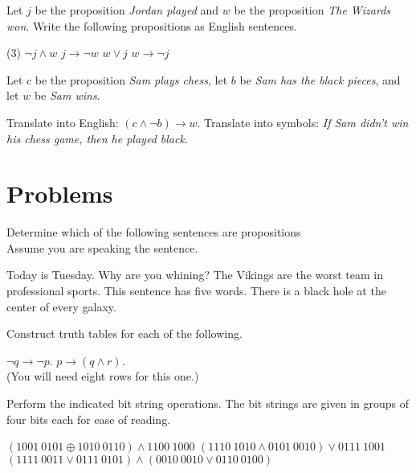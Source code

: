 \clearpage
\begin{exer}
Let $j$ be the proposition {\itshape Jordan played} and $w$ be the proposition 
{\itshape The Wizards won}.
Write the following propositions as English sentences. 

\begin{tasks}(3)
	\task $\lnot j\wedge w$  
	\task $j\to \lnot w$ 
	\task $w\lor j$
	\task $w \to \lnot j$
\end{tasks}
\end{exer}

\begin{exer}
 Let $c$ be the proposition {\itshape Sam plays chess}, let $b$ be {\itshape Sam has the black pieces}, 
and let $w$ be
{\itshape Sam wins}.
\begin{tasks}
       \task Translate into English: $(c\land \lnot b)\to w$.
       \task Translate into symbols: {\itshape If Sam didn't win his chess game, then he  played black.}  
\end{tasks}
\end{exer}

\clearpage
\section{Problems}

\begin{prob}
Determine which of the following sentences are propositions\\
 Assume you are speaking the sentence.
\begin{tasks}
	\task Today is Tuesday.
	\task Why are you whining?
	\task The Vikings are the worst team in professional sports.
	\task This sentence has five words. 
	\task There is a black hole at the center of every galaxy.
\end{tasks}
\end{prob}

\begin{prob}
Construct truth tables for each of the following.
\begin{tasks}
	\task 	$\neg q\longrightarrow \neg p$.
	\task 	$p\longrightarrow (q\wedge r)$. \\
                    (You will need eight rows for this one.)
\end{tasks}
\end{prob}

\begin{prob}
Perform the indicated bit string operations. The bit strings are given
in groups of four bits each for ease of reading. 
\begin{tasks}
        \task $(1001~0101\oplus 1010~0110)\wedge 1100~1000$     
        \task $(1110~1010 \wedge 0101~0010)\lor 0111~1001$
        \task $(1111~0011 \lor 0111~0101)\wedge (0010~0010 \lor 0110~0100)$
\end{tasks}
\end{prob}

